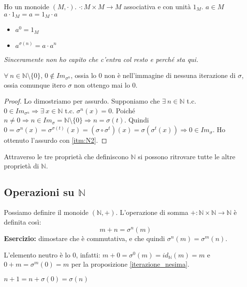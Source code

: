 \begin{defn}[Potenze]
Ho un monoide $(M, \cdot)$. $\cdot : M \times M \to M $ associativa e con unit\`a $1_M$. $a \in M$ $a \cdot 1_M = a = 1_M \cdot a$
\begin{itemize}
  \item $a^0 = 1_M$
  \item $a^{\sigma(n)} = a \cdot a^n$
\end{itemize}
\textit{Sinceramente non ho capito che c'entra col resto e perch\'e sta qui.}
\end{defn}

\begin{prop}
$\forall \ n \in \mathbb{N} \setminus \{ 0 \}$, $0 \notin Im_{\sigma^n}$, ossia lo 0 non \`e nell'immagine di nessuna iterazione di $\sigma$, ossia comunque itero $\sigma$ non ottengo mai lo 0.
\end{prop}
\begin{proof}
Lo dimostriamo per assurdo. Supponiamo che $\exists \ n \in \mathbb{N}$ t.c. $0 \in Im_{\sigma^n} \Rightarrow \exists \ x \in \mathbb{N}$ t.c. $\sigma^n (x) = 0$. Poich\'e $n \neq 0 \Rightarrow n \in Im_{\sigma} = \mathbb{N} \setminus \{ 0 \} \Rightarrow n = \sigma(t)$. Quindi $0 = \sigma^n(x) = \sigma^{\sigma(t)}(x) = (\sigma \circ \sigma^t)(x) = \sigma(\sigma^t(x)) \Rightarrow 0 \in Im_{\sigma}$. Ho ottenuto l'assurdo con \ref{itm:N2}.
\end{proof}
Attraverso le tre propriet\`a che definiscono $\mathbb{N}$ si possono ritrovare tutte le altre propriet\`a di $\mathbb{N}$. 

\subsection{Operazioni su $\mathbb{N}$}

Possiamo definire il monoide $(\mathbb{N}, +)$. L'operazione di somma $+ : \mathbb{N} \times \mathbb{N} \to \mathbb{N}$ \`e definita cos\`i:
\[
m + n = \sigma^{n}(m)
\]
\textbf{Esercizio:} dimostare che \`e commutativa, e che quindi $\sigma^n(m) = \sigma^m(n)$. \vspace{5cm}

L'elemento neutro \`e lo 0, infatti: $ m + 0 = \sigma^0 (m) = id_{\mathbb{N}} (m) = m $ e $ 0 + m = \sigma^m (0) = m $ per la proposizione \ref{iterazione_nesima}.

\begin{oss}
$n + 1 = n + \sigma(0) = \sigma(n)$
\end{oss}

